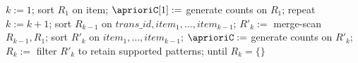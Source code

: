 $k := 1$;
sort $R_1$ on item;
$\aprioriC[1] :=$ generate counts on $R_1$;
repeat
  $k := k + 1$;
  sort $R_{k-1}$ on $trans\_id, item_1,\ldots, item_{k-1}$;
  $R'_k :=$ merge-scan $R_{k-1}, R_1$;
  sort $R'_k$ on $item_1,\ldots, item_{k-1}$;
  $\aprioriC :=$ generate counts on $R'_k$;
  $R_k := $ filter $R'_k$ to retain supported patterns;
until $R_k = \{\}$
  